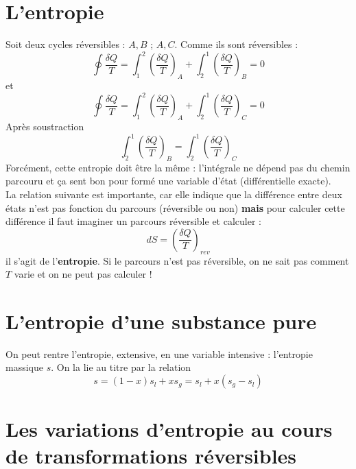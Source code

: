 	
	\section{L'entropie}
	Soit deux cycles réversibles : $A,B$ ; $A,C$. Comme ils sont réversibles  :
	\begin{equation}
	\oint \dfrac{\delta Q}{T} = \int_1^2 \left(\dfrac{\delta Q}{T}\right)_A + 
	\int_2^1 \left(\dfrac{\delta Q}{T}\right)_B = 0
	\end{equation}
	et
	\begin{equation}
		\oint \dfrac{\delta Q}{T} = \int_1^2 \left(\dfrac{\delta Q}{T}\right)_A + 
	\int_2^1 \left(\dfrac{\delta Q}{T}\right)_C = 0
	\end{equation}
	Après soustraction
	\begin{equation}
	\int_2^1 \left(\dfrac{\delta Q}{T}\right)_B = \int_2^1 \left(\dfrac{\delta 
	Q}{T}\right)_C
	\end{equation}
	Forcément, cette entropie doit être la même : l'intégrale ne dépend pas du 
	chemin parcouru et ça sent bon pour formé une variable d'état (différentielle 
	exacte).\\
	La relation suivante est importante, car elle indique que la différence entre 
	deux états n'est pas fonction du parcours (réversible ou non) \textbf{mais} 
	pour calculer cette différence il faut imaginer un parcours réversible et 
	calculer :
	\begin{equation}
	dS = \left(\dfrac{\delta Q}{T}\right)_{rev}
	\end{equation}
	il s'agit de l'\textbf{entropie}. Si le parcours n'est pas réversible, on ne 
	sait pas comment $T$ varie et on ne peut pas calculer !
	
	\section{L’entropie d’une substance pure}
	On peut rentre l'entropie, extensive, en une variable intensive : l'entropie 
	massique $s$. On la lie au titre par la relation
	\begin{equation}
	s = (1-x)s_l + xs_g = s_l + x(s_g-s_l)
	\end{equation}
	
	
	\section{Les variations d’entropie au cours de transformations réversibles}
